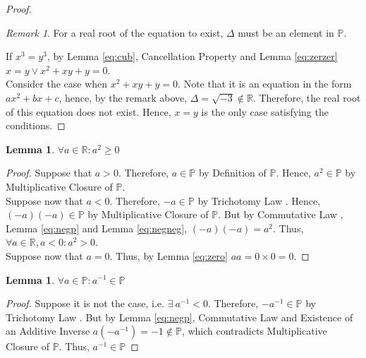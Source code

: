 \documentclass[12pt]{article}
\def\Re{\mathbb{R}}
\def\P{\mathbb{P}}
\def\defi{Definition of }
\def\mclo{Multiplicative Closure of }
\def\ainv{Existence of an Additive Inverse }
\def\comm{Commutative Law }
\def\tric{Trichotomy Law }
\def\canc{Cancellation Property }
\newtheorem{lemma}[theorem]{Lemma}
\theoremstyle{definition}
\theoremstyle{remark}
\newtheorem*{remark}{Remark}
\begin{document}
\begin{proof}
\begin{remark}
For a real root of the equation to exist, $\Delta$ must be an element in $\P$.
\end{remark}

\vspace{0.3in}

If $x^3=y^3$, by Lemma \ref{eq:cub}, \canc and Lemma \ref{eq:zerzer}
$x=y \vee x^2+xy+y=0$.\\
Consider the case when $x^2+xy+y=0$. Note that it is an equation in
the form $ax^2+bx+c$, hence, by the remark above,
$\Delta=\sqrt{-3}\not\in\Re$. Therefore, the real root of this
equation does not exist. Hence, $x=y$ is the only case satisfying
the conditions.

\end{proof}

\begin{lemma}
  \label{eq:psq}
  $\forall a\in\Re:a^2\geq 0$
\end{lemma}
\begin{proof}
  Suppose that $a>0$. Therefore, $a\in\P$ by \defi $\P$. Hence,
  $a^2\in\P$ by \mclo $\P$.\\
  Suppose now that $a<0$. Therefore, $-a\in\P$ by \tric. Hence,
  $(-a)(-a)\in\P$ by \mclo $\P$. But by \comm, Lemma \ref{eq:negp}
  and Lemma \ref{eq:negneg}, $(-a)(-a)=a^2$. Thus, $\forall a\in\Re,a<0:a^2>0$.\\
  Suppose now that $a=0$. Thus, by Lemma \ref{eq:zero} $aa=0\times0=0$.

\end{proof}
\begin{lemma}
  \label{eq:pinv}
  $\forall a\in\P:a^{-1}\in\P$
\end{lemma}
\begin{proof}
  Suppose it is not the case, i.e. $\exists\ a^{-1} < 0$. Therefore,
  $-a^{-1}\in\P$ by \tric. But by Lemma \ref{eq:negp}, \comm and \ainv
  $a(-a^{-1})=-1 \not\in\P$, which contradicts \mclo $\P$. Thus, $a^{-1}\in\P$
\end{proof}
\end{document}
